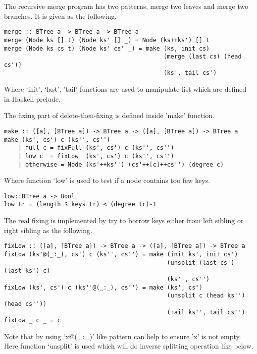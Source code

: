 \documentclass{article}
\begin{document}
The recursive merge program has two patterns, merge two leaves and
merge two branches. It is given as the following.

\begin{lstlisting}
merge :: BTree a -> BTree a -> BTree a
merge (Node ks [] t) (Node ks' [] _) = Node (ks++ks') [] t
merge (Node ks cs t) (Node ks' cs' _) = make (ks, init cs)
                                             (merge (last cs) (head cs'))
                                             (ks', tail cs')
\end{lstlisting}

Where `init', `last', 'tail' functions are used to manipulate
list which are defined in Haskell prelude.

The fixing part of delete-then-fixing is defined inside 'make'
function.

\begin{lstlisting}
make :: ([a], [BTree a]) -> BTree a -> ([a], [BTree a]) -> BTree a
make (ks', cs') c (ks'', cs'')
    | full c = fixFull (ks', cs') c (ks'', cs'')
    | low c  = fixLow  (ks', cs') c (ks'', cs'')
    | otherwise = Node (ks'++ks'') (cs'++[c]++cs'') (degree c)
\end{lstlisting}

Where function `low' is used to test if a node contains too few keys.

\begin{lstlisting}
low::BTree a -> Bool
low tr = (length $ keys tr) < (degree tr)-1
\end{lstlisting} %

The real fixing is implemented by try to borrow keys either from
left sibling or right sibling as the following.

\begin{lstlisting}
fixLow :: ([a], [BTree a]) -> BTree a -> ([a], [BTree a]) -> BTree a
fixLow (ks'@(_:_), cs') c (ks'', cs'') = make (init ks', init cs')
                                              (unsplit (last cs') (last ks') c)
                                              (ks'', cs'')
fixLow (ks', cs') c (ks''@(_:_), cs'') = make (ks', cs')
                                              (unsplit c (head ks'') (head cs''))
                                              (tail ks'', tail cs'')
fixLow _ c _ = c
\end{lstlisting}

Note that by using `x@(\_:\_)' like pattern can help to ensure 'x' is
not empty. Here function `unsplit' is used which will do inverse
splitting operation like below.
\end{document}
